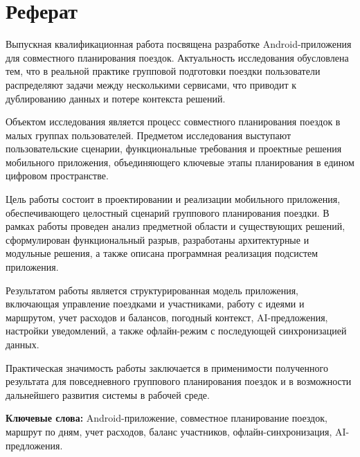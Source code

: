 \section*{Реферат}

Выпускная квалификационная работа посвящена разработке Android-приложения для совместного планирования поездок. Актуальность исследования обусловлена тем, что в реальной практике групповой подготовки поездки пользователи распределяют задачи между несколькими сервисами, что приводит к дублированию данных и потере контекста решений.

Объектом исследования является процесс совместного планирования поездок в малых группах пользователей. Предметом исследования выступают пользовательские сценарии, функциональные требования и проектные решения мобильного приложения, объединяющего ключевые этапы планирования в едином цифровом пространстве.

Цель работы состоит в проектировании и реализации мобильного приложения, обеспечивающего целостный сценарий группового планирования поездки. В рамках работы проведен анализ предметной области и существующих решений, сформулирован функциональный разрыв, разработаны архитектурные и модульные решения, а также описана программная реализация подсистем приложения.

Результатом работы является структурированная модель приложения, включающая управление поездками и участниками, работу с идеями и маршрутом, учет расходов и балансов, погодный контекст, AI-предложения, настройки уведомлений, а также офлайн-режим с последующей синхронизацией данных.

Практическая значимость работы заключается в применимости полученного результата для повседневного группового планирования поездок и в возможности дальнейшего развития системы в рабочей среде.

\textbf{Ключевые слова:} Android-приложение, совместное планирование поездок, маршрут по дням, учет расходов, баланс участников, офлайн-синхронизация, AI-предложения.
